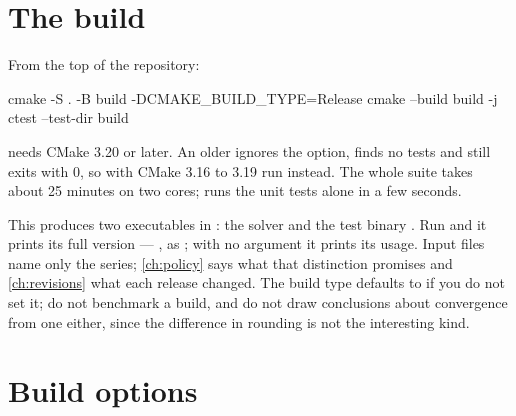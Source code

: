 \section{The build}
\label{sec:install:build}

From the top of the repository:

\begin{shell}
cmake -S . -B build -DCMAKE_BUILD_TYPE=Release
cmake --build build -j
ctest --test-dir build
\end{shell}

 needs CMake 3.20 or later. An older 
ignores the option, finds no tests and still exits with 0, so with CMake 3.16
to 3.19 run  instead. The whole suite takes about 25 minutes on two
cores;  runs the unit tests alone in a few seconds.

This produces two executables in : the solver  and
the test binary . Run  and it
prints its full version --- , as
; with no argument it prints its usage. Input
files name only the  series; \cref{ch:policy} says what that
distinction promises and \cref{ch:revisions} what each release changed. The
build type defaults to 
if you do not set it; do not benchmark a  build, and do not draw
conclusions about convergence from one either, since the difference in rounding
is not the interesting kind.

\section{Build options}
\label{sec:install:options}


